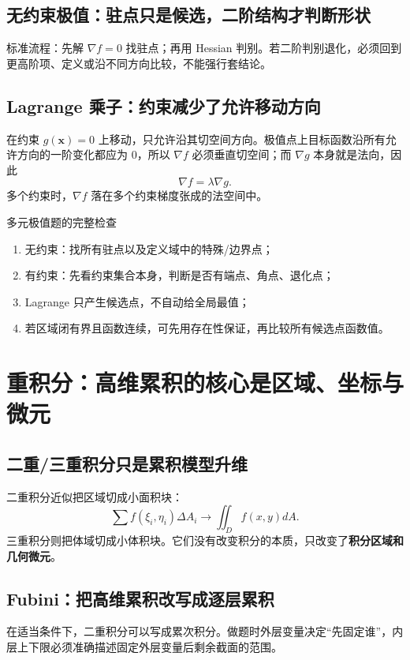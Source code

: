 \documentclass[11pt,a4paper,openany]{ctexbook}
\newcommand{\key}[1]{\textbf{\color{deep}#1}}
\begin{document}
\section{无约束极值：驻点只是候选，二阶结构才判断形状}
标准流程：先解 $\nabla f=0$ 找驻点；再用 Hessian 判别。若二阶判别退化，必须回到更高阶项、定义或沿不同方向比较，不能强行套结论。

\section{Lagrange 乘子：约束减少了允许移动方向}
在约束 $g(\bm x)=0$ 上移动，只允许沿其切空间方向。极值点上目标函数沿所有允许方向的一阶变化都应为 0，所以 $\nabla f$ 必须垂直切空间；而 $\nabla g$ 本身就是法向，因此
\[
\boxed{\nabla f=\lambda\nabla g}.
\]
多个约束时，$\nabla f$ 落在多个约束梯度张成的法空间中。

\begin{methodbox}{多元极值题的完整检查}
\begin{enumerate}
  \item 无约束：找所有驻点以及定义域中的特殊/边界点；
  \item 有约束：先看约束集合本身，判断是否有端点、角点、退化点；
  \item Lagrange 只产生候选点，不自动给全局最值；
  \item 若区域闭有界且函数连续，可先用存在性保证，再比较所有候选点函数值。
\end{enumerate}
\end{methodbox}

\chapter{重积分：高维累积的核心是区域、坐标与微元}

\section{二重/三重积分只是累积模型升维}
二重积分近似把区域切成小面积块：
\[
\sum f(\xi_i,\eta_i)\Delta A_i\to\iint_D f(x,y)dA.
\]
三重积分则把体域切成小体积块。它们没有改变积分的本质，只改变了\key{积分区域和几何微元}。

\section{Fubini：把高维累积改写成逐层累积}
在适当条件下，二重积分可以写成累次积分。做题时外层变量决定“先固定谁”，内层上下限必须准确描述固定外层变量后剩余截面的范围。
\end{document}
